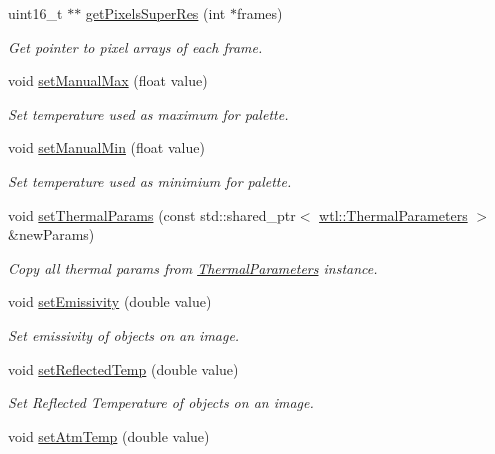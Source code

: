 \begin{DoxyCompactItemize}
uint16\+\_\+t $\ast$$\ast$ \hyperlink{classwtl_1_1_image_radiometric_a06ac3d38bbf4a8b705398c690fee7532}{get\+Pixels\+Super\+Res} (int $\ast$frames)
\begin{DoxyCompactList}\small\item\em Get pointer to pixel arrays of each frame. \end{DoxyCompactList}\item 
void \hyperlink{classwtl_1_1_image_radiometric_ac3064fb2a267f4b2a7975069e5da4920}{set\+Manual\+Max} (float value)
\begin{DoxyCompactList}\small\item\em Set temperature used as maximum for palette. \end{DoxyCompactList}\item 
void \hyperlink{classwtl_1_1_image_radiometric_ae700fe57e3bd44bb8f4ace0b85992fd9}{set\+Manual\+Min} (float value)
\begin{DoxyCompactList}\small\item\em Set temperature used as minimium for palette. \end{DoxyCompactList}\item 
void \hyperlink{classwtl_1_1_image_radiometric_af84a54aef49c990a1795aa20be584cae}{set\+Thermal\+Params} (const std\+::shared\+\_\+ptr$<$ \hyperlink{structwtl_1_1_thermal_parameters}{wtl\+::\+Thermal\+Parameters} $>$ \&new\+Params)
\begin{DoxyCompactList}\small\item\em Copy all thermal params from \hyperlink{structwtl_1_1_thermal_parameters}{Thermal\+Parameters} instance. \end{DoxyCompactList}\item 
void \hyperlink{classwtl_1_1_image_radiometric_ae831386c8e1970728cfe0fd978735078}{set\+Emissivity} (double value)
\begin{DoxyCompactList}\small\item\em Set emissivity of objects on an image. \end{DoxyCompactList}\item 
void \hyperlink{classwtl_1_1_image_radiometric_acade58f2c02c2a37fce92f2f085d28f8}{set\+Reflected\+Temp} (double value)
\begin{DoxyCompactList}\small\item\em Set Reflected Temperature of objects on an image. \end{DoxyCompactList}\item 
void \hyperlink{classwtl_1_1_image_radiometric_a76ca53e05d839b3bb17faf7a054469ad}{set\+Atm\+Temp} (double value)
$$
\end{DoxyCompactItemize}
